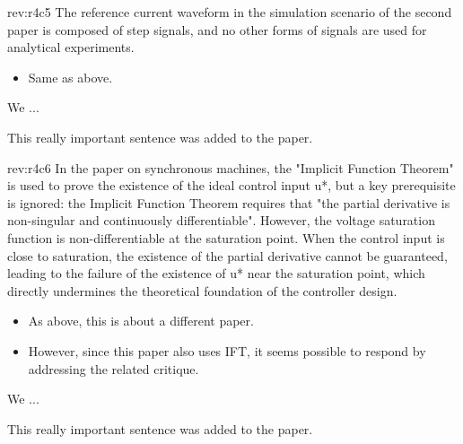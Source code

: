 \documentclass[12pt,english]{reviewresponse}
\begin{document}
\begin{revcomment}[2]{rev:r4c5}
    The reference current waveform in the simulation scenario of the second paper is composed of step signals, and no other forms of signals are used for analytical experiments.
\end{revcomment}

\begin{howtoanswer}
    \begin{itemize}
        \item Same as above.
    \end{itemize}
\end{howtoanswer}

\begin{revresponse}
    We ...
    \begin{changes}
        This really important sentence was added to the paper.
    \end{changes}
\end{revresponse}

\begin{revcomment}[2]{rev:r4c6}
    In the paper on synchronous machines, the "Implicit Function Theorem" is used to prove the existence of the ideal control input u*, but a key prerequisite is ignored: the Implicit Function Theorem requires that "the partial derivative is non-singular and continuously differentiable". However, the voltage saturation function is non-differentiable at the saturation point. When the control input is close to saturation, the existence of the partial derivative cannot be guaranteed, leading to the failure of the existence of u* near the saturation point, which directly undermines the theoretical foundation of the controller design.
\end{revcomment}

\begin{howtoanswer}
    \begin{itemize}
        \item As above, this is about a different paper.
        \item However, since this paper also uses IFT, it seems possible to respond by addressing the related critique.
    \end{itemize}
\end{howtoanswer}

\begin{revresponse}
    We ...
    \begin{changes}
        This really important sentence was added to the paper.
    \end{changes}
\end{revresponse}
\end{document}
